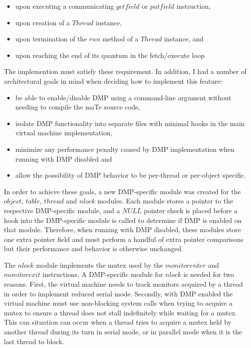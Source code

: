 \begin{itemize}
\item upon executing a communicating $getfield$ or $putfield$
  instruction,
\item upon creation of a $Thread$ instance,
\item upon termination of the $run$ method of a $Thread$ instance, and
\item upon reaching the end of its quantum in the fetch/execute loop
\end{itemize}

The implemention must satisfy these requirement.  In addition, I had a
number of architectural goals in mind when deciding how to implement
this feature:

\begin{itemize}
\item be able to enable/disable DMP using a command-line argument
  without needing to compile the maTe source code,
\item isolate DMP functionality into separate files with minimal hooks
  in the main virtual machine implementation,
\item minimize any performance penalty caused by DMP implementation
  when running with DMP disabled and
\item allow the possibility of DMP behavior to be per-thread or
  per-object specific.
\end{itemize}

In order to achieve these goals, a new DMP-specific module was created
for the $object$, $table$, $thread$ and $nlock$ modules.  Each module
stores a pointer to the respective DMP-specific module, and a $NULL$
pointer check is placed before a hook into the DMP-specific module is
called to determine if DMP is enabled on that module.  Therefore, when
running with DMP disabled, these modules store one extra pointer field
and must perform a handful of extra pointer comparisons but their
performance and behavior is otherwise unchanged.

The $nlock$ module implements the mutex used by the $monitorenter$ and
$monitorexit$ instructions.  A DMP-specific module for $nlock$ is
needed for two reasons.  First, the virtual machine needs to track
monitors acquired by a thread in order to implement reduced serial
mode.  Secondly, with DMP enabled the virtual machine must use
non-blocking system calls when trying to acquire a mutex to ensure a
thread does not stall indefinitely while waiting for a mutex.  This
can situation can occur when a thread tries to acquire a mutex held by
another thread during its turn in serial mode, or in parallel mode
when it is the last thread to block.

